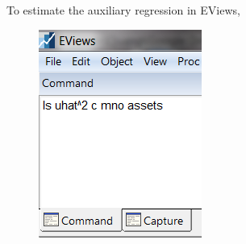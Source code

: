 \documentclass[12pt]{report}
\begin{document}
\noindent To estimate the auxiliary regression in EViews,
\begin{figure}[H]
	\centering
	\includegraphics{tute10_1}
\end{figure}
\vspace{-\baselineskip}
\end{document}
